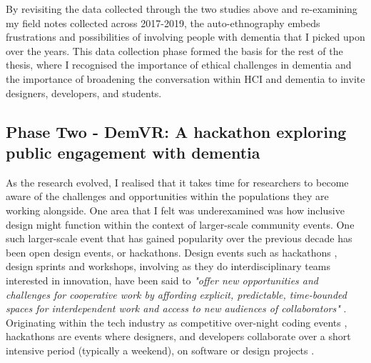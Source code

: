 By revisiting the data collected through the two studies above and re-examining my field notes collected across 2017-2019, the auto-ethnography embeds frustrations and possibilities of involving people with dementia that I picked upon over the years. This data collection phase formed the basis for the rest of the thesis, where I recognised the importance of ethical challenges in dementia and the importance of broadening the conversation within HCI and dementia to invite designers, developers, and students. 

\subsection{Phase Two - DemVR: A hackathon exploring public engagement with dementia}

As the research evolved, I realised that it takes time for researchers to become aware of the challenges and opportunities within the populations they are working alongside. One area that I felt was underexamined was how inclusive design might function within the context of larger-scale community events. One such larger-scale event that has gained popularity over the previous decade has been open design events, or hackathons. Design events such as hackathons \citep{olesen_what_2021}, design sprints and workshops, involving as they do interdisciplinary teams interested in innovation, have been said to \textit{"offer new opportunities and challenges for cooperative work by affording explicit, predictable, time-bounded spaces for interdependent work and access to new audiences of collaborators"} \citep{filippova_hacking_2017}. Originating within the tech industry as competitive over-night coding events \citep{jones_theres_2015}, hackathons are events where designers, and developers collaborate over a short intensive period (typically a weekend), on software or design projects \citep{nandi_hackathons_2016}. 

